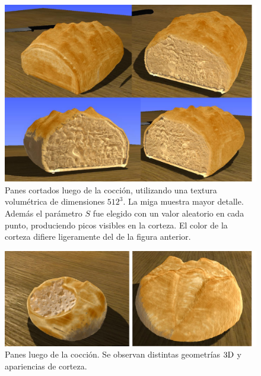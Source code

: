 \begin{figure}[!ht]
\begin{center}
\includegraphics[width=13cm]{figures/Fig11}
\caption[Panes cortados luego de la cocción, utilizando una textura volumétrica de dimensiones $512^{3}$]{Panes cortados luego de la cocción, utilizando una textura volumétrica de dimensiones $512^{3}$. La miga muestra mayor detalle. Además el parámetro $S$ fue elegido con un valor aleatorio en cada punto, produciendo picos visibles en la corteza. El color de la corteza difiere ligeramente del de la figura anterior.}
\label{fg:renders2}
\end{center}
\end{figure}

\begin{figure}[!ht]
\begin{center}
\includegraphics[width=13cm]{figures/Fig12}
\caption[Panes luego de la cocción]{Panes luego de la cocción. Se observan distintas geometrías $\rm 3D$ y apariencias de corteza.}
\label{fg:renders3}
\end{center}
\end{figure}

